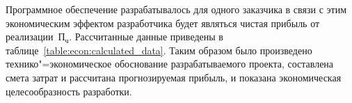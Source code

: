 Программное обеспечение разрабатывалось для одного заказчика в связи с этим экономическим эффектом разработчика будет являться чистая прибыль от реализации~$ \text{П}_\text{ч} $.
Рассчитанные данные приведены в таблице~\ref{table:econ:calculated_data}.
Таким образом было произведено технико"=экономическое обоснование разрабатываемого проекта, составлена смета затрат и рассчитана прогнозируемая прибыль, и показана экономическая целесообразность разработки.

\clearpage


\begin{comment}

Договоренность с заказчиком предусматривает оплату за ПО после его адаптации на стороне заказчика. 
Следствием из данной договоренности являются возникающие риски для организации исполнителя связанные с неуплатой стоимости проекта заказчиком.
На случай провала сделки с определенным заказчиком рассмотрим бизнес"=план, который предусматривает массовую реализацию разрабатываемого ПО по сниженной цене, и оценим экономическую эффективность разработки с данной точки зрения.

\FPeval{\priceFirstYear}{1500}
\FPeval{\priceSecondYear}{1250}
\FPeval{\priceThirdYear}{1000}
Расчетный период для разрабатываемого проекта состоит из трех интервалов времени длительностью один год. 
На рынке существует достаточное количество как платных так и бесплатных аналогов разрабатываемого продукта. Анализ платных продуктов показал, что начальную цену на одну лицензию целесообразно установить ниже средней на рынке в размере $ P_1 = \SI{\priceFirstYear}{\text{тыс.\,\byr}} $, в последующие отрезки времени расчетного периода $ t_2 $ и $ t_3 $ планируется планомерно снижать цену до $ P_2 = \SI{\priceSecondYear}{\text{тыс.\,\byr}} $ и $ P_3 = \SI{\priceThirdYear}{\text{тыс.\,\byr}} $ для привлечения новых клиентов.

\FPeval{\soldInFirstYear}{30}
\FPeval{\soldInSecondYear}{50}
\FPeval{\soldInThirdYear}{40}
В связи с тем, что разрабатываемое ПО не предназначено для широкого круга пользователей, то прогнозируемый уровень продаж для расчетного периода составит $ Q_1 = \num{\soldInFirstYear} $, $ Q_2 = \num{\soldInSecondYear} $ и $ Q_3 = \num{\soldInThirdYear} $ копий.

\FPeval{\revenueInFirstYear}{clip(\soldInFirstYear * \priceFirstYear)}
\FPeval{\revenueInSecondYear}{clip(\soldInSecondYear * \priceSecondYear)}
\FPeval{\revenueInThirdYear}{clip(\soldInThirdYear * \priceThirdYear)}
Выручка от продаж в $i$-й отрезок времени расчетного периода вычисляется по формуле
\begin{equation}
  \label{eq:econ:profit}
  \text{Д}^\text{р}_i = P_i \cdot Q_i \text{\,.}
\end{equation}


\end{comment}
